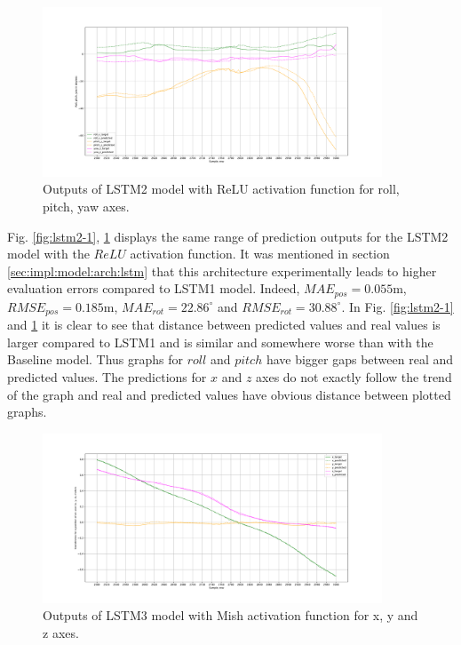 \begin{figure}
	\begin{center}
		\includegraphics[width=0.9\textwidth, keepaspectratio]{gfx/lstm2_relu-roll_pitch_yaw.pdf}
		\caption{\label{fig:lstm2-2} Outputs of LSTM2 model with ReLU activation function for roll, pitch, yaw axes.}
	\end{center}
\end{figure}

Fig. \ref{fig:lstm2-1}, \ref{fig:lstm2-2} displays the same range of prediction outputs for the LSTM2 model with the $ReLU$ activation function. It was mentioned in section \ref{sec:impl:model:arch:lstm} that this architecture experimentally leads to higher evaluation errors compared to LSTM1 model. Indeed, $MAE_{pos} = 0.055$m, $RMSE_{pos} = 0.185$m, $MAE_{rot} = 22.86^{\circ}$ and $RMSE_{rot} =30.88^{\circ}$. In Fig. \ref{fig:lstm2-1} and \ref{fig:lstm2-2} it is clear to see that distance between predicted values and real values is larger compared to LSTM1 and is similar and somewhere worse than with the Baseline model. Thus graphs for $roll$ and $pitch$ have bigger gaps between real and predicted values. The predictions for $x$ and $z$ axes do not exactly follow the trend of the graph and real and predicted values have obvious distance between plotted graphs. 

\begin{figure}[t!]
	\begin{center}
		\includegraphics[width=0.9\textwidth, keepaspectratio]{gfx/lstm3_mish-xyz_position.pdf}
		\caption{\label{fig:lstm3-1} Outputs of LSTM3 model with Mish activation function for x, y and z axes.}
	\end{center}
\end{figure}

